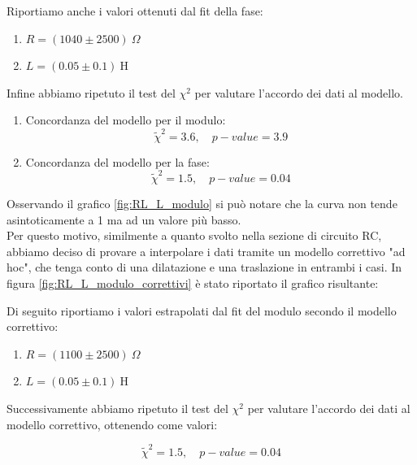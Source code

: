 \documentclass[letterpaper,12pt]{article}
\begin{document}
Riportiamo anche i valori ottenuti dal fit della fase:

\begin{enumerate} 
    \item $ R = (1040 \pm 2500)\ \Omega $
    \item $ L = (0.05 \pm 0.1)\ \text{H} $
\end{enumerate}

Infine abbiamo ripetuto il test del $\chi^2$ per valutare l'accordo dei dati al modello. \\
\begin{enumerate}
    \item Concordanza del modello per il modulo:
$$ \widetilde{\chi}^2 = 3.6, \quad p-value = 3.9 $$ 
    \item Concordanza del modello per la fase:
$$ \widetilde{\chi}^2 = 1.5, \quad p-value = 0.04 $$ 
\end{enumerate}

Osservando il grafico \ref{fig:RL_L_modulo} si può notare che la curva non tende asintoticamente a 1 ma ad un valore più basso. \\
Per questo motivo, similmente a quanto svolto nella sezione di circuito RC, abbiamo deciso di provare a interpolare i dati tramite un modello correttivo "ad hoc", che tenga conto di una dilatazione e una traslazione in entrambi i casi. In figura \ref{fig:RL_L_modulo_correttivi} è stato riportato il grafico risultante:

Di seguito riportiamo i valori estrapolati dal fit del modulo secondo il modello correttivo:
\begin{enumerate} 
    \item $R = (1100 \pm 2500)\ \Omega$ 
    \item $L = (0.05 \pm 0.1)\ \text{H}$ 
\end{enumerate}
Successivamente abbiamo ripetuto il test del $\chi^2$ per valutare l'accordo dei dati al modello correttivo, ottenendo come valori:

$$ \widetilde{\chi}^2 = 1.5, \quad p-value = 0.04 $$ 
\end{document}
